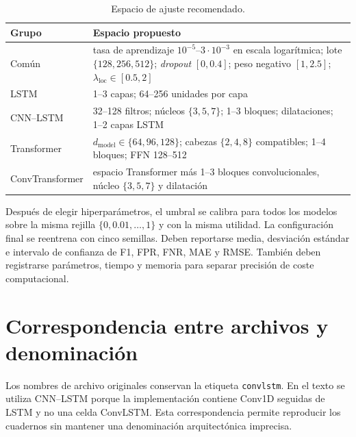 \documentclass[a4paper,12pt]{article}
\begin{document}
\begin{table}[htbp]
\centering
\footnotesize
\begin{tabularx}{\textwidth}{p{3.2cm}Y}
\toprule
\textbf{Grupo} & \textbf{Espacio propuesto} \\
\midrule
Común & tasa de aprendizaje $10^{-5}$--$3\cdot10^{-3}$ en escala logarítmica; lote $\{128,256,512\}$; \emph{dropout} $[0,0.4]$; peso negativo $[1,2.5]$; $\lambda_{\mathrm{loc}}\in[0.5,2]$ \\
LSTM & 1--3 capas; 64--256 unidades por capa \\
CNN--LSTM & 32--128 filtros; núcleos $\{3,5,7\}$; 1--3 bloques; dilataciones; 1--2 capas LSTM \\
Transformer & $d_{\mathrm{model}}\in\{64,96,128\}$; cabezas $\{2,4,8\}$ compatibles; 1--4 bloques; FFN 128--512 \\
ConvTransformer & espacio Transformer más 1--3 bloques convolucionales, núcleo $\{3,5,7\}$ y dilatación \\
\bottomrule
\end{tabularx}
\caption{Espacio de ajuste recomendado.}
\label{tab:tuning-space}
\end{table}

Después de elegir hiperparámetros, el umbral se calibra para todos los modelos sobre la misma rejilla $\{0,0.01,\ldots,1\}$ y con la misma utilidad. La configuración final se reentrena con cinco semillas. Deben reportarse media, desviación estándar e intervalo de confianza de F1, FPR, FNR, MAE y RMSE. También deben registrarse parámetros, tiempo y memoria para separar precisión de coste computacional.

\section{Correspondencia entre archivos y denominación}

Los nombres de archivo originales conservan la etiqueta \texttt{convlstm}. En el texto se utiliza CNN--LSTM porque la implementación contiene Conv1D seguidas de LSTM y no una celda ConvLSTM. Esta correspondencia permite reproducir los cuadernos sin mantener una denominación arquitectónica imprecisa.

\clearpage


\end{document}
